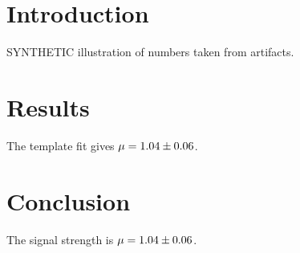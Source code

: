 \documentclass{article}
\begin{document}

\begin{abstract}A SYNTHETIC search finds a signal strength $\mu = \Mu$.\end{abstract}
\section{Introduction}
SYNTHETIC illustration of numbers taken from artifacts.
\section{Results}
The template fit gives $\mu = \Mu$.
\begin{table}\caption{Selected events (SYNTHETIC).}\MassTable\end{table}
\section{Conclusion}
The signal strength is $\mu = \Mu$.
\end{document}
